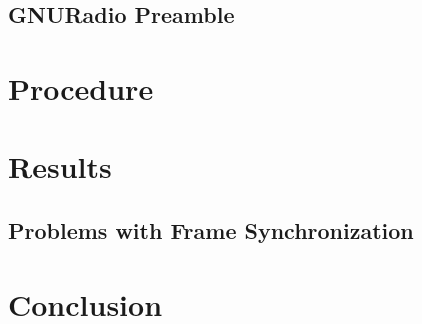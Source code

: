 \documentclass[conference]{IEEEtran}
\begin{document}
\subsection{GNURadio Preamble}

\section{Procedure}

\section{Results}

\subsection{Problems with Frame Synchronization}

\section{Conclusion}







\end{document}
